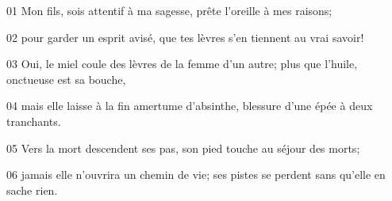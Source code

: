 01 Mon fils, sois attentif à ma sagesse, prête l’oreille à mes raisons;

02 pour garder un esprit avisé, que tes lèvres s’en tiennent au vrai savoir!

03 Oui, le miel coule des lèvres de la femme d’un autre; plus que l’huile, onctueuse est sa bouche,

04 mais elle laisse à la fin amertume d’absinthe, blessure d’une épée à deux tranchants.

05 Vers la mort descendent ses pas, son pied touche au séjour des morts;

06 jamais elle n’ouvrira un chemin de vie; ses pistes se perdent sans qu’elle en sache rien.
